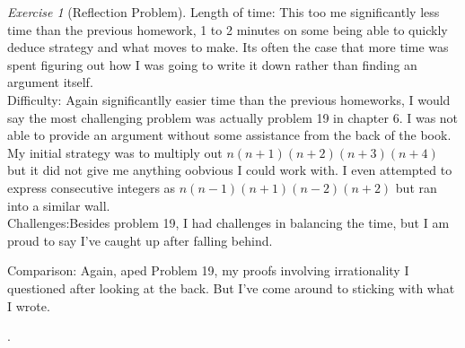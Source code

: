 \documentclass[12pt]{amsart}
\makeatletter
\theoremstyle{remark}
\newtheorem*{exercise}{Exercise}%
\renewenvironment{proof}[1][\proofname]{\par\doublespacing
  \pushQED{\qed}%
  \normalfont \topsep6\p@\@plus6\p@\relax
  \list{}{%
    \settowidth{\leftmargin}{\itshape\proofname:\hskip\labelsep}%
    \setlength{\labelwidth}{0pt}%
    \setlength{\itemindent}{-\leftmargin}%
  }%
  \item[\hskip\labelsep\itshape#1\@addpunct{:}]\ignorespaces
}{%
  \popQED\endlist\@endpefalse
  \singlespacing
}
\theoremstyle{mycomment}
\makeatother
\begin{document}
\begin{exercise}[Reflection Problem]
\begin{proof}
Length of time: This too me significantly less time than the previous homework, 1 to 2 minutes on some being able to quickly deduce strategy and what moves to make. Its often the case that more time was spent figuring out how I was going to write it down rather than finding an argument itself. \\

Difficulty: Again significantlly easier time than the previous homeworks, I would say the most challenging problem was actually problem 19 in chapter 6. I was not able to provide an argument without some assistance from the back of the book. My initial strategy was to multiply out $n(n+1)(n+2)(n+3)(n+4)$ but it did not give me anything oobvious I could work with. I even attempted to express consecutive integers as $n(n-1)(n+1)(n-2)(n+2)$ but ran into a similar wall. \\

Challenges:Besides problem 19, I had challenges in balancing the time, but I am proud to say I've caught up after falling behind.

Comparison: Again, aped Problem 19, my proofs involving irrationality I questioned after looking at the back. But I've come around to sticking with what I wrote.
\end{proof}
\end{exercise}.















 
\end{document}

